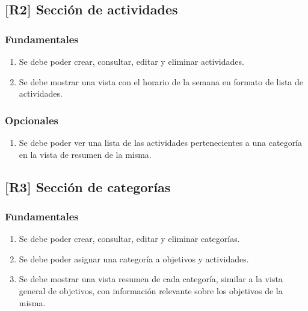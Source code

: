 \documentclass[10pt, a4paper]{aqademic}
\begin{document}
\subsection*{[R2] Sección de actividades}

\subsubsection*{Fundamentales}

\begin{enumerate}[label=\textbf{R2.\arabic*f}, leftmargin=10mm]
	\item Se debe poder crear, consultar, editar y eliminar actividades.
	
	\item Se debe mostrar una vista con el horario de la semana en formato de lista de actividades.
\end{enumerate}

\subsubsection*{Opcionales}

\begin{enumerate}[label=\textbf{R2.\arabic*o}, leftmargin=10mm]
	\item Se debe poder ver una lista de las actividades pertenecientes a una categoría en la vista de resumen de la misma.
\end{enumerate}


\subsection*{[R3] Sección de categorías}

\subsubsection*{Fundamentales}

\begin{enumerate}[label=\textbf{R3.\arabic*f}, leftmargin=10mm]
	\item Se debe poder crear, consultar, editar y eliminar categorías.
	
	\item Se debe poder asignar una categoría a objetivos y actividades.
	
	\item Se debe mostrar una vista resumen de cada categoría, similar a la vista general de objetivos, con información relevante sobre los objetivos de la misma.
\end{enumerate}
\end{document}
